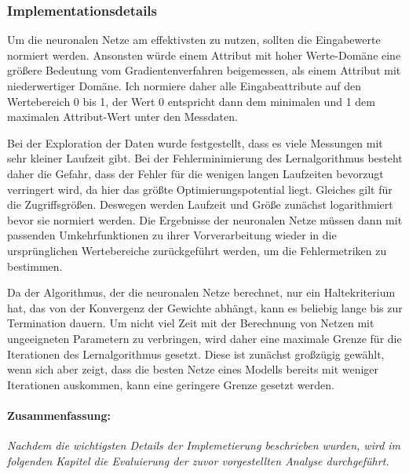 \documentclass[
	twoside,
	12pt,
	a4paper,
	BCOR10mm,
	DIV14,
	listof=totoc,
	bibliography=totoc,
	headsepline
]{scrreprt}
\begin{document}
\subsubsection{Implementationsdetails}
Um die neuronalen Netze am effektivsten zu nutzen, sollten die Eingabewerte normiert werden. Ansonsten würde einem Attribut mit hoher Werte-Domäne eine größere Bedeutung vom Gradientenverfahren beigemessen, als einem Attribut mit niederwertiger Domäne. 
Ich normiere daher alle Eingabeattribute auf den Wertebereich 0 bis 1, der Wert 0 entspricht dann dem minimalen und 1 dem maximalen Attribut-Wert unter den Messdaten.\medskip

Bei der Exploration der Daten wurde festgestellt, dass es viele Messungen mit sehr kleiner Laufzeit gibt.
Bei der Fehlerminimierung des Lernalgorithmus besteht daher die Gefahr, dass der Fehler für die wenigen langen Laufzeiten bevorzugt verringert wird, da hier das größte Optimierungspotential liegt. Gleiches gilt für die Zugriffsgrößen.
Deswegen werden Laufzeit und Größe zunächst logarithmiert bevor sie normiert werden.
Die Ergebnisse der neuronalen Netze müssen dann mit passenden Umkehrfunktionen zu ihrer Vorverarbeitung wieder in die ursprünglichen Wertebereiche zurückgeführt werden, um die Fehlermetriken zu bestimmen.\medskip

Da der Algorithmus, der die neuronalen Netze berechnet, nur ein Haltekriterium hat, das von der Konvergenz der Gewichte abhängt, kann es beliebig lange bis zur Termination dauern.
Um nicht viel Zeit mit der Berechnung von Netzen mit ungeeigneten Parametern zu verbringen, wird daher eine maximale Grenze für die Iterationen des Lernalgorithmus gesetzt. Diese ist zunächst großzügig gewählt, wenn sich aber zeigt, dass die besten Netze eines Modells bereits mit weniger Iterationen auskommen, kann eine geringere Grenze gesetzt werden.

\paragraph{Zusammenfassung:}
\textit{
	Nachdem die wichtigsten Details der Implemetierung beschrieben wurden, wird im folgenden Kapitel die Evaluierung der zuvor vorgestellten Analyse durchgeführt.
}
\end{document}
